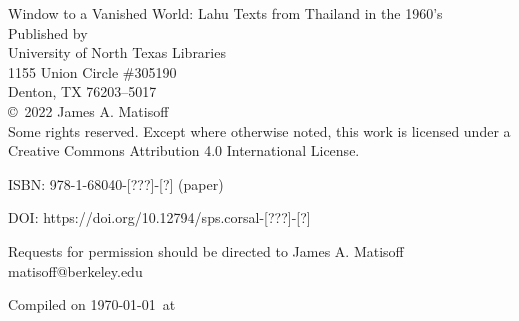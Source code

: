 \thispagestyle{empty}
\begin{center}
\vspace*{\fill}
Window to a Vanished World: Lahu Texts from Thailand in the 1960’s \\
\vspace{10em}
Published by \\
University of North Texas Libraries \\
1155 Union Circle \#305190 \\
Denton, TX  76203–5017 \\
\vspace{10em}
\copyright \ 2022 James A. Matisoff \\
Some rights reserved. Except where otherwise noted, this work is licensed under a Creative Commons Attribution 4.0 International License.

ISBN: 978-1-68040-[???]-[?] (paper)

DOI: https://doi.org/10.12794/sps.corsal-[???]-[?]


Requests for permission should be directed to James A. Matisoff matisoff@berkeley.edu

\vspace{4em}
Compiled on \today\ at \currenttime
\vspace*{\fill}
\end{center}